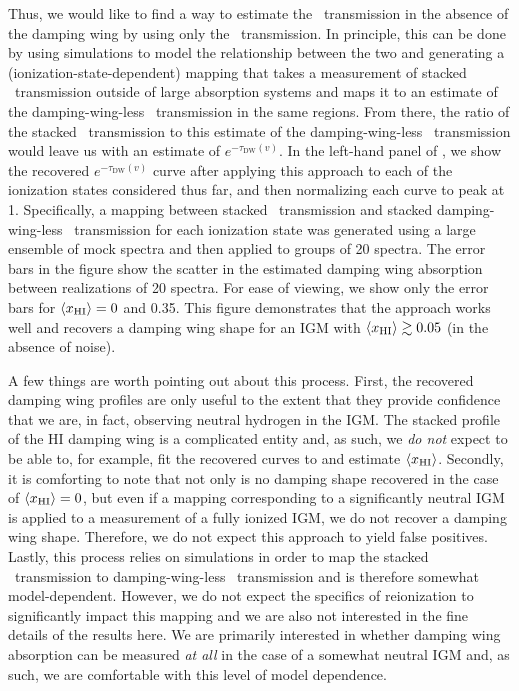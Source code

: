 Thus, we would like to find a way to estimate the \lya\ transmission in the absence of the damping wing by using only the \lyb\ transmission. In principle, this can be done by using simulations to model the relationship between the two and generating a (ionization-state-dependent) mapping that takes a measurement of stacked \lyb\ transmission outside of large absorption systems and maps it to an estimate of the damping-wing-less \lya\ transmission in the same regions. From there, the ratio of the stacked \lya\ transmission to this estimate of the damping-wing-less \lya\ transmission would leave us with an estimate of $e^{-\tau_{\text{DW}}(v)}$. In the left-hand panel of , we show the recovered $e^{-\tau_{\text{DW}}(v)}$ curve after applying this approach to each of the ionization states considered thus far, and then normalizing each curve to peak at 1. Specifically, a mapping between stacked \lyb\ transmission and stacked damping-wing-less \lya\ transmission for each ionization state was generated using a large ensemble of mock spectra and then applied to groups of 20 spectra. The error bars in the figure show the scatter in the estimated damping wing absorption between realizations of 20 spectra. For ease of viewing, we show only the error bars for $\langle x_{\text{HI}}\rangle = 0$ and 0.35. This figure demonstrates that the approach works well and recovers a damping wing shape for an IGM with $\langle x_{\text{HI}}\rangle \gtrsim 0.05$ (in the absence of noise).


A few things are worth pointing out about this process. First, the recovered damping wing profiles are only useful to the extent that they provide confidence that we are, in fact, observing neutral hydrogen in the IGM. The stacked profile of the HI damping wing is a complicated entity and, as such, we \textit{do not} expect to be able to, for example, fit the recovered curves to  and estimate $\langle x_{\text{HI}}\rangle$. 
Secondly, it is comforting to note that not only is no damping shape recovered in the case of $\langle x_{\text{HI}}\rangle = 0$, but even if a mapping corresponding to a significantly neutral IGM is applied to a measurement of a fully ionized IGM, we do not recover a damping wing shape. Therefore, we do not expect this approach to yield false positives. Lastly, this process relies on simulations in order to map the stacked \lyb\ transmission to  damping-wing-less \lya\ transmission and is therefore somewhat model-dependent. However, we do not expect the specifics of reionization to significantly impact this mapping and we are also not interested in the fine details of the results here. We are primarily interested in whether damping wing absorption can be measured \textit{at all} in the case of a somewhat neutral IGM and, as such, we are comfortable with this level of model dependence. 


